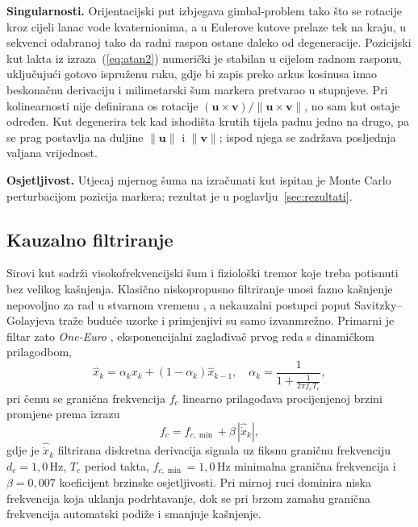 \textbf{Singularnosti.} Orijentacijski put izbjegava gimbal-problem tako što se
rotacije kroz cijeli lanac vode kvaternionima, a u Eulerove kutove prelaze tek
na kraju, u sekvenci odabranoj tako da radni raspon ostane daleko od
degeneracije. Pozicijski kut lakta iz izraza~(\ref{eq:atan2}) numerički je stabilan
u cijelom radnom rasponu, uključujući gotovo ispruženu ruku, gdje bi zapis preko
arkus kosinusa imao beskonačnu derivaciju i milimetarski šum markera pretvarao u
stupnjeve. Pri kolinearnosti nije definirana os rotacije $(\mathbf{u} \times
\mathbf{v})/\lVert \mathbf{u} \times \mathbf{v} \rVert$, no sam kut ostaje
određen. Kut degenerira tek kad ishodišta krutih tijela padnu jedno na drugo,
pa se prag postavlja na duljine $\lVert \mathbf{u} \rVert$ i $\lVert \mathbf{v}
\rVert$; ispod njega se zadržava posljednja valjana vrijednost.

\textbf{Osjetljivost.} Utjecaj mjernog šuma na izračunati kut ispitan je Monte
Carlo perturbacijom pozicija markera; rezultat je u
poglavlju~\ref{sec:rezultati}.

\subsection{Kauzalno filtriranje}

Sirovi kut sadrži visokofrekvencijski šum i fiziološki tremor koje treba
potisnuti bez velikog kašnjenja. Klasično niskopropusno filtriranje unosi fazno
kašnjenje nepovoljno za rad u stvarnom vremenu \cite[str.~2]{zhu2022}, a
nekauzalni postupci poput Savitzky--Golayjeva traže buduće uzorke i primjenjivi
su samo izvanmrežno. Primarni je filtar zato \emph{One-Euro} \cite{casiez2012},
eksponencijalni zaglađivač prvog reda s dinamičkom prilagodbom,
\begin{equation}
  \hat{x}_k = \alpha_k x_k + (1 - \alpha_k)\hat{x}_{k-1}, \quad \alpha_k = \frac{1}{1 + \frac{1}{2\pi f_c T_e}},
  \label{eq:one_euro}
\end{equation}
pri čemu se granična frekvencija $f_c$ linearno prilagođava procijenjenoj brzini promjene prema izrazu
\begin{equation}
  f_c = f_{c,\min} + \beta \, |\hat{\dot{x}}_k|,
  \label{eq:one_euro_fc}
\end{equation}
gdje je $\hat{\dot{x}}_k$ filtrirana diskretna derivacija signala uz fiksnu graničnu frekvenciju $d_c = 1{,}0$\,Hz, $T_e$ period takta, $f_{c,\min}=1{,}0$\,Hz minimalna granična frekvencija i $\beta=0{,}007$ koeficijent brzinske osjetljivosti. Pri mirnoj ruci dominira niska frekvencija koja uklanja podrhtavanje, dok se pri brzom zamahu granična frekvencija automatski podiže i smanjuje kašnjenje.

